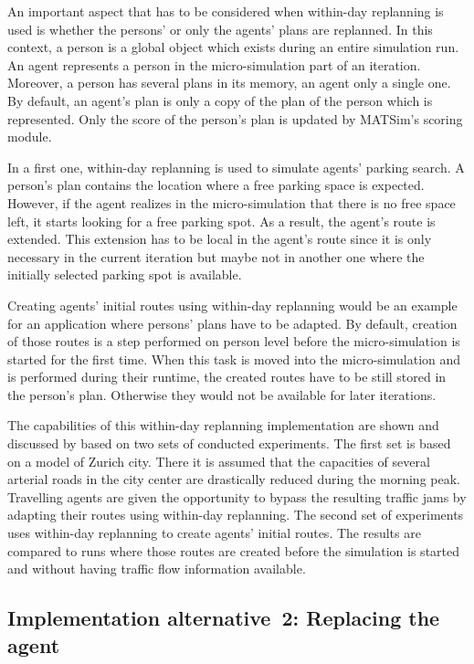 An important aspect that has to be considered when within-day replanning is used is whether the persons' or only the agents' plans are replanned. In this context, a person is a global object which exists during an entire simulation run. An agent represents a person in the micro-simulation part of an iteration. Moreover, a person has several plans in its memory, an agent only a single one. By default, an agent's plan is only a copy of the plan of the person which is represented. Only the score of the person's plan is updated by MATSim's scoring module. 

In a first one, within-day replanning is used to simulate agents' parking search. A person's plan contains the location where a free parking space is expected. However, if the agent realizes in the micro-simulation that there is no free space left, it starts looking for a free parking spot. As a result, the agent's route is extended. This extension has to be local in the agent's route since it is only necessary in the current iteration
but maybe not in another one where the initially selected parking spot is available.

Creating agents' initial routes using within-day replanning would be an example for an application where persons' plans have to be adapted. By default, creation of those routes is a step performed on person level before the micro-simulation is started for the first time. When this task is moved into the micro-simulation and is performed during their runtime, the created routes have to be still stored in the person's plan. Otherwise they would not be available for later iterations.

The capabilities of this within-day replanning implementation are shown and discussed by \citet{Dobler_PhDThesis_2013} based on two sets of conducted experiments. The first set is based on a model of Zurich city. There it is assumed that the capacities of several arterial roads in the city center are drastically reduced during the morning peak. Travelling agents are given the opportunity to bypass the resulting traffic jams by adapting their routes using within-day replanning. The second set of experiments uses within-day replanning to create agents' initial routes. The results are compared to runs where those routes are created before the simulation is started and without having traffic flow information available.

\subsection{Implementation alternative~2: Replacing the agent}
\label{sec:impl-repl-the-ag}

